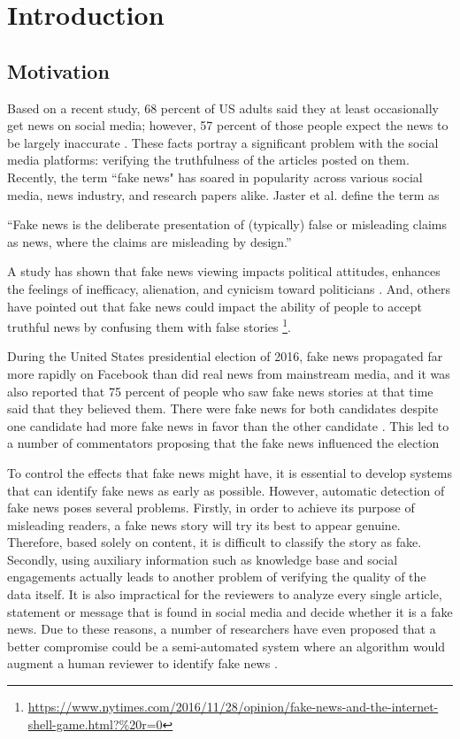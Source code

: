 \chapter{Introduction}\label{introduction}

\section{Motivation}\label{intro:motivation}
Based on a recent study, 68 percent of US adults said they at least occasionally get news on social media; however, 57 percent of those people expect the news to be largely inaccurate \cite{matsa2018news}. These facts portray a significant problem with the social media platforms: verifying the truthfulness of the articles posted on them. Recently, the term ``fake news" has soared in popularity across various social media, news industry, and research papers alike. Jaster et al. define the term as \cite{gelfert2018fake}

\enquote{Fake news is the deliberate presentation of (typically) false or misleading claims as news, where the claims are misleading by design.}

\noindent
A study has shown that fake news viewing impacts political attitudes, enhances the feelings of inefficacy, alienation, and cynicism toward politicians \cite{balmas2014fake}. And, others have pointed out that fake news could impact the ability of people to accept truthful news by confusing them with false stories \footnote{\url{https://www.nytimes.com/2016/11/28/opinion/fake-news-and-the-internet-shell-game.html?\%20r=0}}.

During the United States presidential election of 2016, fake news propagated far more rapidly on Facebook than did real news from mainstream media\cite{silverman2016analysis}, and it was also reported that 75 percent of people who saw fake news stories at that time said that they believed them\cite{silverman2016most}. There were fake news for both candidates despite one candidate had more fake news in favor than the other candidate \cite{silverman2016analysis}. This led to a number of commentators proposing that the fake news influenced the election  \cite{parkinson2016click, read2016donald, dewey2016facebook}

To control the effects that fake news might have, it is essential to develop systems that can identify fake news as early as possible. However, automatic detection of fake news poses several problems. Firstly, in order to achieve its purpose of misleading readers, a fake news story will try its best to appear genuine. Therefore, based solely on content, it is difficult to classify the story as fake. Secondly, using auxiliary information such as knowledge base and social engagements actually leads to another problem of verifying the quality of the data itself\cite{shu2017fake}. It is also impractical for the reviewers to analyze every single article, statement or message that is found in social media and decide whether it is a fake news. Due to these reasons, a number of researchers have even proposed that a better compromise could be a semi-automated system where an algorithm would augment a human reviewer to identify fake news \cite{conroy2015automatic, chen2015news, wiegand2016veracity}.

